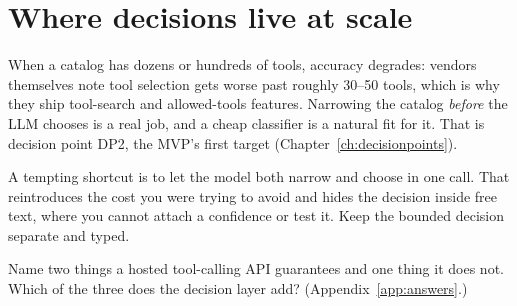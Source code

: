 \section{Where decisions live at scale}

When a catalog has dozens or hundreds of tools, accuracy degrades: vendors themselves note
tool selection gets worse past roughly 30--50 tools, which is why they ship tool-search and
allowed-tools features. Narrowing the catalog \emph{before} the LLM chooses is a real job,
and a cheap classifier is a natural fit for it. That is decision point DP2, the MVP's first
target (Chapter~\ref{ch:decisionpoints}).

\begin{pitfall}
A tempting shortcut is to let the model both narrow and choose in one call. That reintroduces
the cost you were trying to avoid and hides the decision inside free text, where you cannot
attach a confidence or test it. Keep the bounded decision separate and typed.
\end{pitfall}

\begin{checkbox}
Name two things a hosted tool-calling API guarantees and one thing it does not. Which of the
three does the decision layer add? (Appendix~\ref{app:answers}.)
\end{checkbox}
